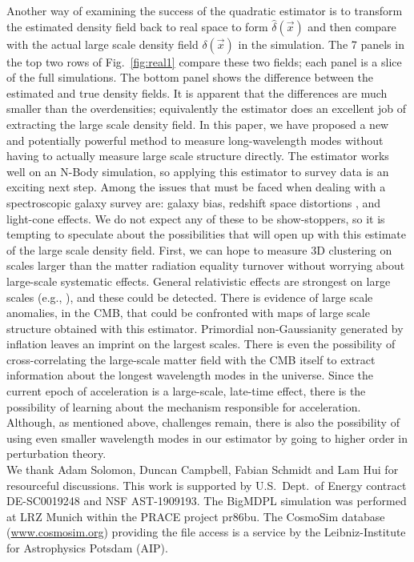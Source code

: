 \documentclass[prd,amsmath,amssymb,floatfix,superscriptaddress,nofootinbib,twocolumn]{revtex4-1}
\newcommand{\rf}[1]{\ref{fig:#1}}
\begin{document}
Another way of examining the success of the quadratic estimator is to transform the estimated density field back to real space to form $\hat\delta(\vec x)$ and then compare with the actual large scale density field $\delta(\vec x)$ in the simulation. The 7 panels in the top two rows of Fig.~\rf{real1} compare these two fields; each panel is a slice of the full simulations. The bottom panel shows the difference between the estimated and true density fields. It is apparent that the differences are much smaller than the overdensities; equivalently the estimator does an excellent job of extracting the large scale density field.
\label{sec4}
In this paper, we have proposed a new and potentially powerful method to measure long-wavelength modes without having to actually measure large scale structure directly. The estimator works well on an N-Body simulation, so applying this estimator to survey data is an exciting next step. Among the issues that must be faced when dealing with a spectroscopic galaxy survey are: galaxy bias, redshift space distortions \cite{Kaiser:1987rsd}, and light-cone effects. We do not expect any of these to be show-stoppers, so it is tempting to speculate about the possibilities that will open up with this estimate of the large scale density field. 
First, we can hope to measure 3D clustering on scales larger than the matter radiation equality turnover without worrying about large-scale systematic effects. General relativistic effects are strongest on large scales (e.g., \cite{Jeong:2012ls}), and these could be detected. There is evidence of large scale anomalies, in the CMB, that could be confronted with maps of large scale structure obtained with this estimator. Primordial non-Gaussianity generated by inflation leaves an imprint on the largest scales. There is even the possibility of cross-correlating the large-scale matter field with the CMB itself to extract information about the longest wavelength modes in the universe. Since the current epoch of acceleration is a large-scale, late-time effect, there is the possibility of learning about the mechanism responsible for acceleration. Although, as mentioned above, challenges remain, there is also the possibility of using even smaller wavelength modes in our estimator by going to higher order in perturbation theory.\\

\noindent We thank Adam Solomon, Duncan Campbell, Fabian Schmidt and Lam Hui for resourceful discussions.  This work is supported by U.S.\ Dept.\ of Energy contract DE-SC0019248 and NSF AST-1909193.
The BigMDPL simulation was performed at LRZ Munich within the PRACE project pr86bu. The CosmoSim database (\url{www.cosmosim.org}) providing the file access is a service by the Leibniz-Institute for Astrophysics Potsdam (AIP).
\end{document}
